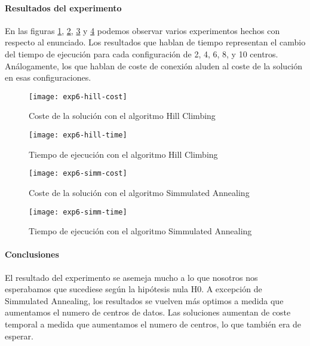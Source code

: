 \paragraph{Resultados del experimento}

En las figuras \ref{fig:exp6-hill-cost}, \ref{fig:exp6-hill-time}, 
\ref{fig:exp6-simm-cost} y \ref{fig:exp6-simm-time} podemos observar
varios experimentos hechos con respecto al enunciado. Los resultados que
hablan de tiempo representan el cambio del tiempo de ejecución para
cada configuración de 2, 4, 6, 8, y 10 centros. Análogamente, los que
hablan de coste de conexión aluden al coste de la solución en esas
configuraciones.

\begin{figure}[h]
  \centering
  \texttt{[image: exp6-hill-cost]}
  \caption {Coste de la solución con el algoritmo Hill Climbing}
  \label{fig:exp6-hill-cost}
\end{figure}

\begin{figure}[h]
  \centering
  \texttt{[image: exp6-hill-time]}
  \caption {Tiempo de ejecución con el algoritmo Hill Climbing}
  \label{fig:exp6-hill-time}
\end{figure}

\begin{figure}[h]
  \centering
  \texttt{[image: exp6-simm-cost]}
  \caption {Coste de la solución con el algoritmo Simmulated Annealing}
  \label{fig:exp6-simm-cost}
\end{figure}

\begin{figure}[h]
  \centering
  \texttt{[image: exp6-simm-time]}
  \caption {Tiempo de ejecución con el algoritmo Simmulated Annealing}
  \label{fig:exp6-simm-time}
\end{figure}

\paragraph{Conclusiones}

El resultado del experimento se asemeja mucho a lo que nosotros nos esperabamos
que sucediese según la hipótesis nula H0. A excepción de Simmulated Annealing,
los resultados se vuelven más optimos a medida que aumentamos el numero de
centros de datos. Las soluciones aumentan de coste temporal a medida que
aumentamos el numero de centros, lo que también era de esperar.

